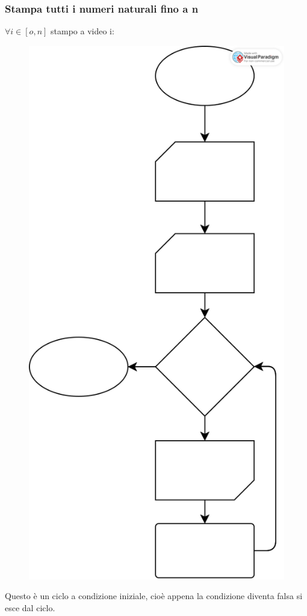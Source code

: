 \documentclass[a4paper]{article}
\theoremstyle{break}
\theoremstyle{break}
\theoremstyle{break}
\theoremstyle{break}
\begin{document}
\subsubsection{Stampa tutti i numeri naturali fino a n}
\( \forall i \in [o,n] \) stampo a video i:
\begin{figure}
	\includegraphics{numeriNaturali}
\end{figure}
Questo è un ciclo a condizione iniziale, cioè appena la condizione diventa falsa
si esce dal ciclo.
\end{document}
